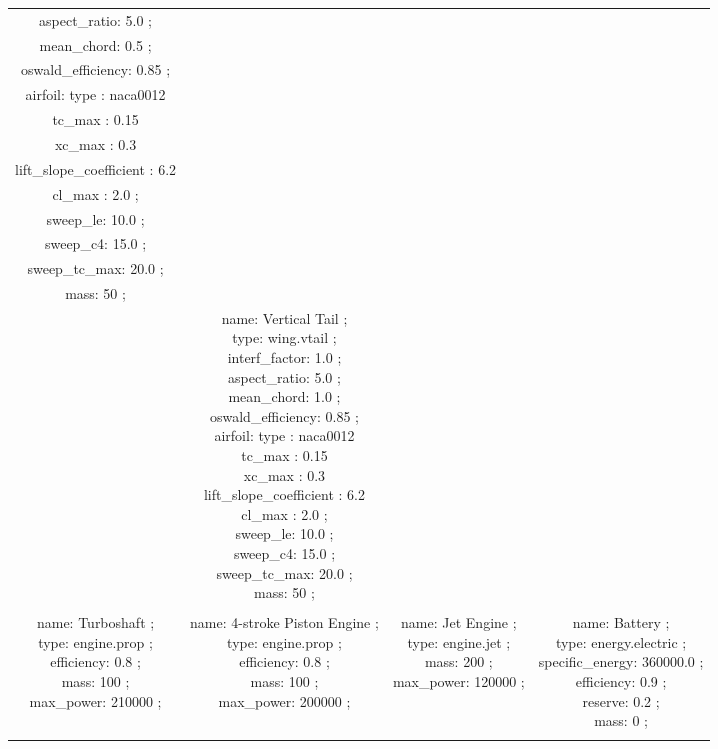 \begin{table}[h]
\begin{adjustbox}{width=1\textwidth}
\begin{tabular}{|c|c|c|c|}
\\ aspect\_ratio: 5.0 ; \\ mean\_chord: 0.5 ; \\ oswald\_efficiency: 0.85 ; \\ airfoil:   type :  naca0012  \\   tc\_max : 0.15 \\   xc\_max : 0.3 \\   lift\_slope\_coefficient : 6.2 \\   cl\_max : 2.0  ; \\ sweep\_le: 10.0 ; \\ sweep\_c4: 15.0 ; \\ sweep\_tc\_max: 20.0 ; \\ mass: 50 ; \\ } & \makecell{name: Vertical Tail ; \\ type: wing.vtail ; \\ interf\_factor: 1.0 ; \\ aspect\_ratio: 5.0 ; \\ mean\_chord: 1.0 ; \\ oswald\_efficiency: 0.85 ; \\ airfoil:   type :  naca0012  \\   tc\_max : 0.15 \\   xc\_max : 0.3 \\   lift\_slope\_coefficient : 6.2 \\   cl\_max : 2.0  ; \\ sweep\_le: 10.0 ; \\ sweep\_c4: 15.0 ; \\ sweep\_tc\_max: 20.0 ; \\ mass: 50 ; \\ }\\ \hline \\ 
\makecell{name: Turboshaft ; \\ type: engine.prop ; \\ efficiency: 0.8 ; \\ mass: 100 ; \\ max\_power: 210000 ; \\ } & \makecell{name: 4-stroke Piston Engine ; \\ type: engine.prop ; \\ efficiency: 0.8 ; \\ mass: 100 ; \\ max\_power: 200000 ; \\ } & \makecell{name: Jet Engine ; \\ type: engine.jet ; \\ mass: 200 ; \\ max\_power: 120000 ; \\ } & \makecell{name: Battery ; \\ type: energy.electric ; \\ specific\_energy: 360000.0 ; \\ efficiency: 0.9 ; \\ reserve: 0.2 ; \\ mass: 0 ; \\ }\\ \hline \\ 

\end{tabular}
\end{adjustbox}
\end{table}
